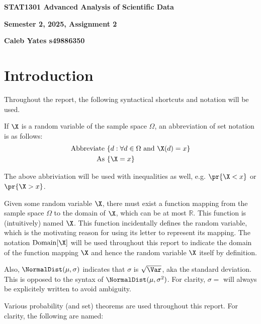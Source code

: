 \begin{center}

{\Large  {\bf STAT1301 Advanced Analysis of Scientific Data}}
\medskip

{\large {\bf Semester 2, 2025, Assignment 2}}

\medskip

{\large {\bf Caleb Yates s49886350}}


\end{center}

\section*{Introduction}

Throughout the report, the following syntactical shortcuts and notation will be used.

If $\X$ is a random variable of the sample space $\Omega$, an abbreviation of set notation is as follows:
\begin{align*}
\text{Abbreviate	} & \{ d : \forall d \in \Omega \text{ and } \X(d) = x \} \\
\text{As	} & \{ \X = x \}
\end{align*}

The above abbriviation will be used with inequalities as well, e.g. $\pr{\X < x}$ or $\pr{\X > x}$.

Given some random variable $\X$, there must exist a function mapping from the sample space $\Omega$ to the domain of $\X$,
which can be at most $\mathbb{R}$. This function is (intuitively) named $\X$.
This function incidentally defines the random variable, which is the motivating reason for using its letter to represent its mapping.
The notation $\mathrm{Domain}[\X]$ will be used throughout this report to indicate the domain of the function mapping $\X$ and hence
the random variable $\X$ itself by definition.

Also, $\NormalDist(\mu, \sigma)$ indicates that $\sigma$ is $\sqrt{\Var}$, aka the standard deviation. This is opposed to the syntax of $\NormalDist(\mu, \sigma^2)$. For clarity, $\sigma = $ will always be explicitely written to avoid ambiguity.

Various probability (and set) theorems are used throughout this report. For clarity, the following are named:


